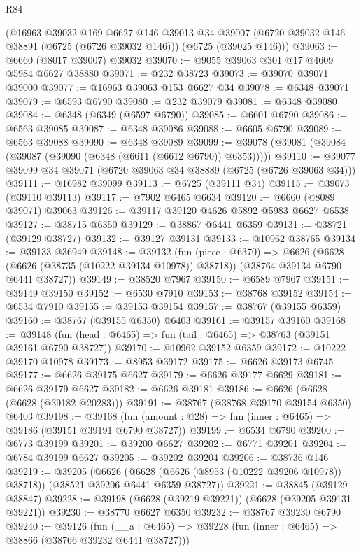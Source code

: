 \begin{lexlean}{R84}
\begin{coremodule}
    (@16963
      @39032
      @169
      @6627
      @146
      @39013
      @34
      @39007
      (@6720 @39032 @146 @38891 (@6725 (@6726 @39032 @146)))
      (@6725 (@39025 @146)))
@39063 := @6660 (@8017 @39007) @39032
@39070 := @9055 @39063 @301 @17 @4609 @5984 @6627 @38880
@39071 := @232 @38723
@39073 := @39070 @39071 @39000
@39077 := @16963 @39063 @153 @6627 @34
@39078 := @6348 @39071
@39079 := @6593 @6790
@39080 := @232 @39079
@39081 := @6348 @39080
@39084 := @6348 (@6349 (@6597 @6790))
@39085 := @6601 @6790
@39086 := @6563 @39085
@39087 := @6348 @39086
@39088 := @6605 @6790
@39089 := @6563 @39088
@39090 := @6348 @39089
@39099 := @39078 (@39081 (@39084 (@39087 (@39090 (@6348 (@6611 (@6612 @6790)) @6353)))))
@39110 := @39077 @39099 @34 @39071 (@6720 @39063 @34 @38889 (@6725 (@6726 @39063 @34)))
@39111 := @16982 @39099
@39113 := @6725 (@39111 @34)
@39115 := @39073 (@39110 @39113)
@39117 := @7902 @6465 @6634
@39120 := @6660 (@8089 @39071) @39063
@39126 := @39117 @39120 @4626 @5892 @5983 @6627 @6538
@39127 := @38715 @6350
@39129 := @38867 @6441 @6359
@39131 := @38721 (@39129 @38727)
@39132 := @39127 @39131
@39133 := @10962 @38765
@39134 := @39133 @36949
@39148 := @39132
    (fun (piece : @6370) =>
    @6626 (@6628 (@6626 (@38735 (@10222 @39134 @10978)) @38718)) (@38764 @39134 @6790 @6441 @38727))
@39149 := @38520 @7967
@39150 := @6589 @7967
@39151 := @39149 @39150
@39152 := @6530 @7910
@39153 := @38768 @39152
@39154 := @6534 @7910
@39155 := @39153 @39154
@39157 := @38767 (@39155 @6359)
@39160 := @38767 (@39155 @6350) @6403
@39161 := @39157 @39160
@39168 := @39148 (fun (head : @6465) => fun (tail : @6465) => @38763 (@39151 @39161 @6790 @38727))
@39170 := @10962 @39152 @6359
@39172 := @10222 @39170 @10978
@39173 := @8953 @39172
@39175 := @6626 @39173 @6745
@39177 := @6626 @39175 @6627
@39179 := @6626 @39177 @6629
@39181 := @6626 @39179 @6627
@39182 := @6626 @39181
@39186 := @6626 (@6628 (@6628 (@39182 @20283)))
@39191 := @38767 (@38768 @39170 @39154 @6350) @6403
@39198 := @39168 (fun (amount : @28) => fun (inner : @6465) => @39186 (@39151 @39191 @6790 @38727))
@39199 := @6534 @6790
@39200 := @6773 @39199
@39201 := @39200 @6627
@39202 := @6771 @39201
@39204 := @6784 @39199 @6627
@39205 := @39202 @39204
@39206 := @38736 @146
@39219 := @39205
    (@6626 (@6628 (@6626 (@8953 (@10222 @39206 @10978)) @38718)) (@38521 @39206 @6441 @6359 @38727))
@39221 := @38845 (@39129 @38847)
@39228 := @39198 (@6628 (@39219 @39221)) (@6628 (@39205 @39131 @39221))
@39230 := @38770 @6627 @6350
@39232 := @38767 @39230 @6790
@39240 := @39126
    (fun (__a : @6465) => @39228 (fun (inner : @6465) => @38866 (@38766 @39232 @6441 @38727)))

\end{coremodule}
\end{lexlean}
